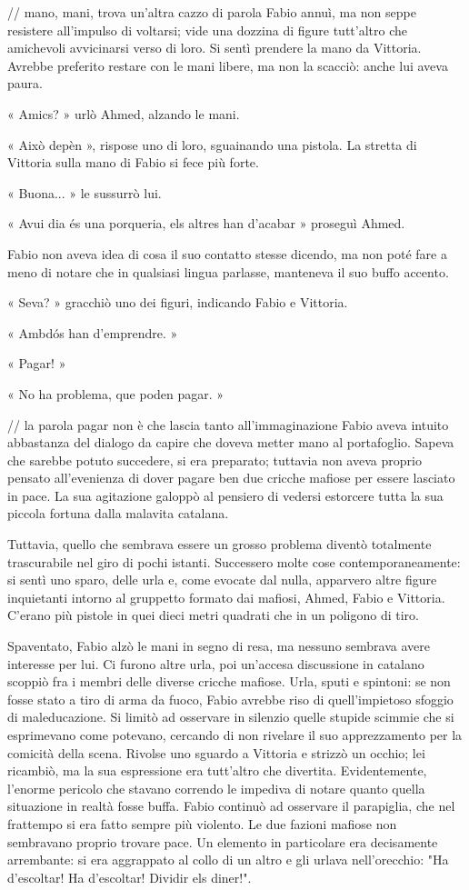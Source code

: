 // mano, mani, trova un'altra cazzo di parola
Fabio annuì, ma non seppe resistere all'impulso di voltarsi; vide una dozzina di figure tutt'altro che amichevoli avvicinarsi verso di loro. Si sentì prendere la mano da Vittoria. Avrebbe preferito restare con le mani libere, ma non la scacciò: anche lui aveva paura.

« Amics? » urlò Ahmed, alzando le mani.

« Això depèn », rispose uno di loro, sguainando una pistola. La stretta di Vittoria sulla mano di Fabio si fece più forte.

« Buona... » le sussurrò lui.

« Avui dia és una porqueria, els altres han d'acabar » proseguì Ahmed.

Fabio non aveva idea di cosa il suo contatto stesse dicendo, ma non poté fare a meno di notare che in qualsiasi lingua parlasse, manteneva il suo buffo accento.

« Seva? » gracchiò uno dei figuri, indicando Fabio e Vittoria.

« Ambdós han d'emprendre. »

« Pagar! »

« No ha problema, que poden pagar. »

// la parola pagar non è che lascia tanto all'immaginazione
Fabio aveva intuito abbastanza del dialogo da capire che doveva metter mano al portafoglio. Sapeva che sarebbe potuto succedere, si era preparato; tuttavia non aveva proprio pensato all'evenienza di dover pagare ben due cricche mafiose per essere lasciato in pace. La sua agitazione galoppò al pensiero di vedersi estorcere tutta la sua piccola fortuna dalla malavita catalana.

Tuttavia, quello che sembrava essere un grosso problema diventò totalmente trascurabile nel giro di pochi istanti. Successero molte cose contemporaneamente: si sentì uno sparo, delle urla e, come evocate dal nulla, apparvero altre figure inquietanti intorno al gruppetto formato dai mafiosi, Ahmed, Fabio e Vittoria. C'erano più pistole in quei dieci metri quadrati che in un poligono di tiro.

Spaventato, Fabio alzò le mani in segno di resa, ma nessuno sembrava avere interesse per lui. Ci furono altre urla, poi un'accesa discussione in catalano scoppiò fra i membri delle diverse cricche mafiose. Urla, sputi e spintoni: se non fosse stato a tiro di arma da fuoco, Fabio avrebbe riso di quell'impietoso sfoggio di maleducazione. Si limitò ad osservare in silenzio quelle stupide scimmie che si esprimevano come potevano, cercando di non rivelare il suo apprezzamento per la comicità della scena. Rivolse uno sguardo a Vittoria e strizzò un occhio; lei ricambiò, ma la sua espressione era tutt'altro che divertita. Evidentemente, l'enorme pericolo che stavano correndo le impediva di notare quanto quella situazione in realtà fosse buffa. Fabio continuò ad osservare il parapiglia, che nel frattempo si era fatto sempre più violento. Le due fazioni mafiose non sembravano proprio trovare pace. Un elemento in particolare era decisamente arrembante: si era aggrappato al collo di un altro e gli urlava nell'orecchio: "Ha d'escoltar! Ha d'escoltar! Dividir els diner!".

